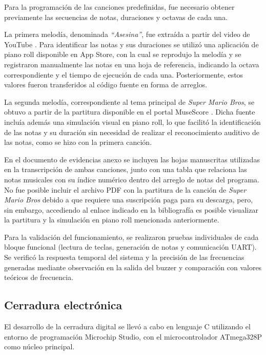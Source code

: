 Para la programación de las canciones predefinidas, fue necesario obtener previamente las secuencias de notas, duraciones y octavas de cada una. 

La primera melodía, denominada \textit{“Asesina”}, fue extraída a partir del video de YouTube \cite{youtube_asesina}. Para identificar las notas y sus duraciones se utilizó una aplicación de piano roll disponible en App Store, con la cual se reprodujo la melodía y se registraron manualmente las notas en una hoja de referencia, indicando la octava correspondiente y el tiempo de ejecución de cada una. Posteriormente, estos valores fueron transferidos al código fuente en forma de arreglos.

La segunda melodía, correspondiente al tema principal de \textit{Super Mario Bros}, se obtuvo a partir de la partitura disponible en el portal MuseScore \cite{musescore_mario}. Dicha fuente incluía además una simulación visual en piano roll, lo que facilitó la identificación de las notas y su duración sin necesidad de realizar el reconocimiento auditivo de las notas, como se hizo con la primera canción. 

En el documento de evidencias anexo se incluyen las hojas manuscritas utilizadas en la transcripción de ambas canciones, junto con una tabla que relaciona las notas musicales con su índice numérico dentro del arreglo de notas del programa. No fue posible incluir el archivo PDF con la partitura de la canción de \textit{Super Mario Bros} debido a que requiere una suscripción paga para su descarga, pero, sin embargo, accediendo al enlace indicado en la bibliografía es posible visualizar la partitura y la simulación en piano roll mencionada anteriormente.

Para la validación del funcionamiento, se realizaron pruebas individuales de cada bloque funcional (lectura de teclas, generación de notas y comunicación UART). Se verificó la respuesta temporal del sistema y la precisión de las frecuencias generadas mediante observación en la salida del buzzer y comparación con valores teóricos de frecuencia.

\vspace{0.4cm}

\subsection{Cerradura electrónica}

El desarrollo de la cerradura digital se llevó a cabo en lenguaje C utilizando el entorno de programación Microchip Studio, 
con el microcontrolador ATmega328P como núcleo principal. 

